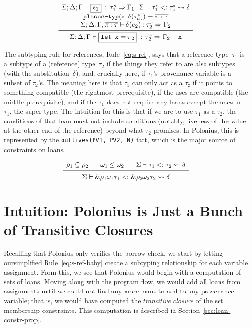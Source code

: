\documentclass[11pt,a4paper,twoside,openany]{report}
\newcommand{\InDatalog}[1]{\texttt{#1}}
\newcommand{\expression}[1]{\boxed{#1}}
\newcommand{\ntyperule}[2]{\begin{array}{c}#1\\\midrule\raisebox{1pt}{\strut}#2\end{array}}
\begin{document}
\begin{equation}\label{eq:t-let}
  \ntyperule{
    \Sigma ; \Delta ; \Gamma \vdash \expression{e_1} \: : \: \tau_1^s \Rightarrow \Gamma_1
    \:\:\: \Sigma \vdash \tau_1 ^s <: \tau_a^s \leadsto \delta \\
    \texttt{places-typ}(\mathtt{x}, \delta(\tau^s_a)) = \overline{\pi : \tau} \\
    \Sigma ; \Delta ; \Gamma, \overline{\pi : \tau} \vdash \delta(e_2) : \tau_2^s \Rightarrow \Gamma_2
  }
  {\Sigma ; \Delta ; \Gamma \vdash \expression{\texttt{let } \mathtt{x} = \pi_2} \: : \: \tau_2^s \Rightarrow \Gamma_2 - \mathtt{x}}
\end{equation}

The subtyping rule for references, Rule~\eqref{eq:s-ref}, says that a reference
type~$\tau_1$ is a subtype of a (reference) type~$\tau_2$ if the things they
refer to are also subtypes (with the substitution~$\delta$), and, crucially
here, if $\tau_1$'s provenance variable is a subset of $\tau_2$'s. The meaning
here is that $\tau_1$ can only act as a $\tau_2$ if it points to something
compatible (the rightmost prerequisite), if the uses are compatible (the middle
prerequisite), and if the $\tau_1$ does not require any loans except the ones in
$\tau_1$, the super-type. The intuition for this is that if we are to use
$\tau_1$ as a $\tau_2$, the conditions of that loan must not include conditions
(notably, liveness of the value at the other end of the reference) beyond what
$\tau_2$ promises. In Polonius, this is represented by the
\InDatalog{outlives(PV1, PV2, N)} fact, which is the major source of constraints
on loans.

\begin{equation}\label{eq:s-ref}
  \ntyperule{
    \rho_1 \subseteq \rho_2 \:\:\:\:\:\:\:\:
    \omega_1 \leq \omega_2 \:\:\:\:\:\:\:\:
    \Sigma \vdash \tau_1 <: \tau_2 \leadsto \delta
  }
  {
    \Sigma \vdash \&\rho_1 \omega_1 \tau_1 <: \& \rho_2 \omega_2 \tau_2 \leadsto \delta
  }
\end{equation}

\section{Intuition: Polonius is Just a Bunch of Transitive
  Closures}\label{sec:borrow-check-intuition}

Recalling that Polonius only verifies the borrow check, we start by letting
oursimplified Rule~\eqref{eq:s-ref-baby} create a subtyping relationship for
each variable assignment. From this, we see that Polonius would begin with a
computation of sets of loans. Moving along with the program flow, we would add
all loans from assignments until we could not find any more loans to add to any
provenance variable; that is, we would have computed the \textit{transitive
  closure} of the set membership constraints. This computation is described in
Section~\ref{sec:loan-constr-prop}.
\end{document}
